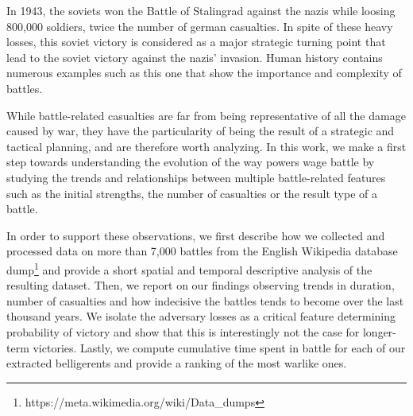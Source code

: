 In 1943, the soviets won the Battle of Stalingrad against the nazis while loosing 800,000 soldiers, twice the number of german casualties. In spite of these heavy losses, this soviet victory is considered as a major strategic turning point that lead to the soviet victory against the nazis' invasion. Human history contains numerous examples such as this one that show the importance and complexity of battles.

While battle-related casualties are far from being representative of all the damage caused by war, they have the particularity of being the result of a strategic and tactical planning, and are therefore worth analyzing. In this work, we make a first step towards understanding the evolution of the way powers wage battle by studying the trends and relationships between multiple battle-related features such as the initial strengths, the number of casualties or the result type of a battle. 

In order to support these observations, we first describe how we collected and processed data on more than 7,000 battles from the English Wikipedia database dump\footnote{https://meta.wikimedia.org/wiki/Data\_dumps} and provide a short spatial and temporal descriptive analysis of the resulting dataset. Then, we report on our findings observing trends in duration, number of casualties and how indecisive the battles tends to become over the last thousand years. We isolate the adversary losses as a critical feature determining probability of victory and show that this is interestingly not the case for longer-term victories. Lastly, we compute cumulative time spent in battle for each of our extracted belligerents and provide a ranking of the most warlike ones.  
